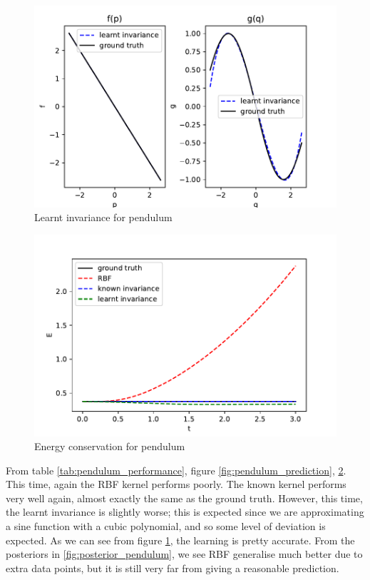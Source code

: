\documentclass{statsmsc}
\begin{document}
\begin{figure}[H] 
  \includegraphics[width=\linewidth]{../codes/figures/pendulum_learnt.pdf}
  \centering
  \caption{Learnt invariance for pendulum}
  \label{fig:pendulum_learnt}
\end{figure}

\begin{figure}[H] 
  \includegraphics[width=\linewidth]{../codes/figures/pendulum_energy.pdf}
  \centering
  \caption{Energy conservation for pendulum}
  \label{fig:pendulum_energy}
\end{figure}

From table \ref{tab:pendulum_performance}, figure \ref{fig:pendulum_prediction}, \ref{fig:pendulum_energy}.
This time, again the RBF kernel performs poorly.
The known kernel performs very well again, almost exactly the same as the ground truth.
However, this time, the learnt invariance is slightly worse; this is expected since we are approximating a sine function with a cubic polynomial, and so some level of deviation is expected.
As we can see from figure \ref{fig:pendulum_learnt}, the learning is pretty accurate.
From the posteriors in \ref{fig:posterior_pendulum}, we see RBF generalise much better due to extra data points, but it is still very far from giving a reasonable prediction. 
\end{document}
